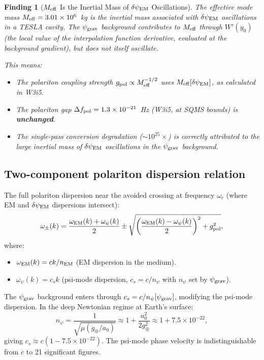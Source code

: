 \documentclass[11pt]{article}
\newtheorem{finding}{Finding}
\newcommand{\ee}[1]{\times 10^{#1}}
\newcommand{\psigrav}{\psi_{\rm grav}}
\newcommand{\dpsiEM}{\delta\psi_{\rm EM}}
\newcommand{\Meff}{M_{\rm eff}}
\newcommand{\npsi}{n_\psi}
\newcommand{\mufd}{\mu}
\begin{document}
\begin{finding}[$\Meff$ Is the Inertial Mass of $\dpsiEM$ Oscillations]
\label{find:Meff-dpsi}
The effective mode mass $\Meff = 3.01\ee{6}$~kg is the inertial mass
associated with $\dpsiEM$ oscillations in a TESLA cavity. The
$\psigrav$ background contributes to $\Meff$ through $W'(y_0)$ (the
local value of the interpolation function derivative, evaluated at
the background gradient), but does not itself oscillate.

This means:
\begin{itemize}[nosep]
  \item The polariton coupling strength $g_{\rm pol} \propto \Meff^{-1/2}$
    uses $\Meff[\dpsiEM]$, as calculated in W3i5.
  \item The polariton gap $\Delta f_{\rm pol} = 1.3\ee{-21}$~Hz
    (W3i5, at SQMS bounds) is \textbf{unchanged}.
  \item The single-pass conversion degradation ($\sim 10^{25}\times$)
    is correctly attributed to the large inertial mass of $\dpsiEM$
    oscillations in the $\psigrav$ background.
\end{itemize}
\end{finding}

\subsection{Two-component polariton dispersion relation}

The full polariton dispersion near the avoided crossing at frequency
$\omega_c$ (where EM and $\dpsiEM$ dispersions intersect):
\begin{equation}
\omega_\pm(k) = \frac{\omega_{\rm EM}(k) + \omega_\psi(k)}{2}
\pm \sqrt{\left(\frac{\omega_{\rm EM}(k) - \omega_\psi(k)}{2}\right)^2
+ g_{\rm pol}^2},
\label{eq:polariton-dispersion}
\end{equation}
where:
\begin{itemize}[nosep]
  \item $\omega_{\rm EM}(k) = ck/n_{\rm EM}$ (EM dispersion in the medium).
  \item $\omega_\psi(k) = c_s k$ (psi-mode dispersion, $c_s = c/\npsi$
    with $\npsi$ set by $\psigrav$).
\end{itemize}

The $\psigrav$ background enters through $c_s = c/\npsi[\psigrav]$,
modifying the psi-mode dispersion. In the deep Newtonian regime at
Earth's surface:
\begin{equation}
\npsi = \frac{1}{\sqrt{\mufd(g_\oplus/a_0)}} \approx 1 + \frac{a_0^2}{2g_\oplus^2}
\approx 1 + 7.5\ee{-22},
\label{eq:npsi-Newton-Earth}
\end{equation}
giving $c_s \approx c(1 - 7.5\ee{-22})$. The psi-mode phase velocity
is indistinguishable from $c$ to 21 significant figures.
\end{document}
